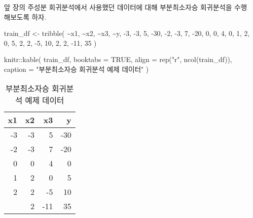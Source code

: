 \documentclass[
]{book}
\newenvironment{Shaded}{\begin{snugshade}}{\end{snugshade}}
\newcommand{\AttributeTok}[1]{\textcolor[rgb]{0.77,0.63,0.00}{#1}}
\newcommand{\ConstantTok}[1]{\textcolor[rgb]{0.00,0.00,0.00}{#1}}
\newcommand{\DecValTok}[1]{\textcolor[rgb]{0.00,0.00,0.81}{#1}}
\newcommand{\FunctionTok}[1]{\textcolor[rgb]{0.00,0.00,0.00}{#1}}
\newcommand{\NormalTok}[1]{#1}
\newcommand{\OtherTok}[1]{\textcolor[rgb]{0.56,0.35,0.01}{#1}}
\newcommand{\SpecialCharTok}[1]{\textcolor[rgb]{0.00,0.00,0.00}{#1}}
\newcommand{\StringTok}[1]{\textcolor[rgb]{0.31,0.60,0.02}{#1}}
\begin{document}
앞 장의 주성분 회귀분석에서 사용했던 데이터에 대해 부분최소자승 회귀분석을 수행해보도록 하자.

\begin{Shaded}
\begin{Highlighting}[]
\NormalTok{train\_df }\OtherTok{\textless{}{-}} \FunctionTok{tribble}\NormalTok{(}
  \SpecialCharTok{\textasciitilde{}}\NormalTok{x1, }\SpecialCharTok{\textasciitilde{}}\NormalTok{x2, }\SpecialCharTok{\textasciitilde{}}\NormalTok{x3, }\SpecialCharTok{\textasciitilde{}}\NormalTok{y,}
  \SpecialCharTok{{-}}\DecValTok{3}\NormalTok{, }\SpecialCharTok{{-}}\DecValTok{3}\NormalTok{, }\DecValTok{5}\NormalTok{, }\SpecialCharTok{{-}}\DecValTok{30}\NormalTok{,}
  \SpecialCharTok{{-}}\DecValTok{2}\NormalTok{, }\SpecialCharTok{{-}}\DecValTok{3}\NormalTok{, }\DecValTok{7}\NormalTok{, }\SpecialCharTok{{-}}\DecValTok{20}\NormalTok{,}
  \DecValTok{0}\NormalTok{, }\DecValTok{0}\NormalTok{, }\DecValTok{4}\NormalTok{, }\DecValTok{0}\NormalTok{,}
  \DecValTok{1}\NormalTok{, }\DecValTok{2}\NormalTok{, }\DecValTok{0}\NormalTok{, }\DecValTok{5}\NormalTok{,}
  \DecValTok{2}\NormalTok{, }\DecValTok{2}\NormalTok{, }\SpecialCharTok{{-}}\DecValTok{5}\NormalTok{, }\DecValTok{10}\NormalTok{,}
  \DecValTok{2}\NormalTok{, }\DecValTok{2}\NormalTok{, }\SpecialCharTok{{-}}\DecValTok{11}\NormalTok{, }\DecValTok{35}
\NormalTok{)}

\NormalTok{knitr}\SpecialCharTok{::}\FunctionTok{kable}\NormalTok{(}
\NormalTok{  train\_df, }\AttributeTok{booktabs =} \ConstantTok{TRUE}\NormalTok{,}
  \AttributeTok{align =} \FunctionTok{rep}\NormalTok{(}\StringTok{"r"}\NormalTok{, }\FunctionTok{ncol}\NormalTok{(train\_df)),}
  \AttributeTok{caption =} \StringTok{"부분최소자승 회귀분석 예제 데이터"}
\NormalTok{)}
\end{Highlighting}
\end{Shaded}

\begin{table}

\caption{\label{tab:plsr-example-data}부분최소자승 회귀분석 예제 데이터}
\centering
\begin{tabular}[t]{rrrr}
\toprule
x1 & x2 & x3 & y\\
\midrule
-3 & -3 & 5 & -30\\
-2 & -3 & 7 & -20\\
0 & 0 & 4 & 0\\
1 & 2 & 0 & 5\\
2 & 2 & -5 & 10\\
\addlinespace
2 & 2 & -11 & 35\\
\bottomrule
\end{tabular}
\end{table}
\end{document}
